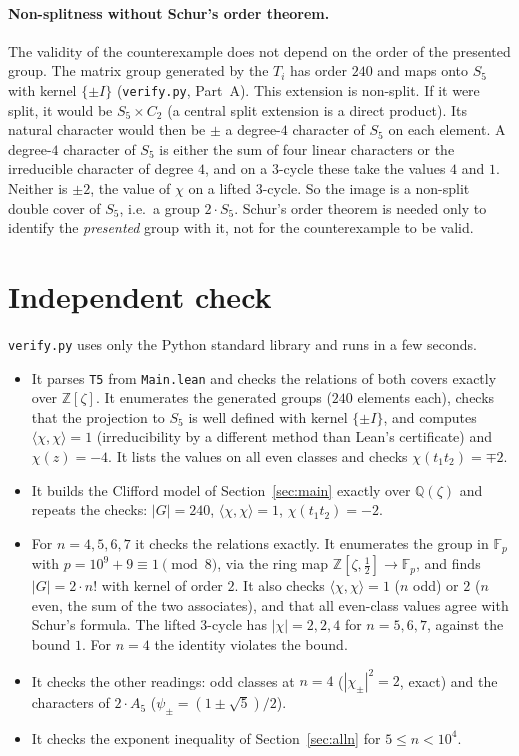 \documentclass[11pt]{article}
\theoremstyle{remark}
\begin{document}
\paragraph{Non-splitness without Schur's order theorem.} The validity of the counterexample does
not depend on the order of the presented group. The matrix group generated by the $T_i$ has order
$240$ and maps onto $S_5$ with kernel $\{\pm I\}$ (\texttt{verify.py}, Part~A). This extension is
non-split. If it were split, it would be $S_5\times C_2$ (a central split extension is a direct
product). Its natural character would then be $\pm$ a degree-$4$ character of $S_5$ on each element.
A degree-$4$ character of $S_5$ is either the sum of four linear characters or the irreducible
character of degree $4$, and on a $3$-cycle these take the values $4$ and $1$. Neither is $\pm2$, the
value of $\chi$ on a lifted $3$-cycle. So the image is a non-split double cover of $S_5$, i.e.\ a
group $2\cdot S_5$. Schur's order theorem is needed only to identify the \emph{presented} group with
it, not for the counterexample to be valid.

\section{Independent check}
\texttt{verify.py} uses only the Python standard library and runs in a few seconds.
\begin{itemize}
\item[A.] It parses \texttt{T5} from \texttt{Main.lean} and checks the relations of both covers
  exactly over $\mathbb{Z}[\zeta]$. It enumerates the generated groups ($240$ elements each),
  checks that the projection to $S_5$ is well defined with kernel $\{\pm I\}$, and computes
  $\langle\chi,\chi\rangle=1$ (irreducibility by a different method than Lean's certificate) and
  $\chi(z)=-4$. It lists the values on all even classes and checks $\chi(t_1t_2)=\mp2$.
\item[B.] It builds the Clifford model of Section~\ref{sec:main} exactly over $\mathbb{Q}(\zeta)$
  and repeats the checks: $|G|=240$, $\langle\chi,\chi\rangle=1$, $\chi(t_1t_2)=-2$.
\item[C.] For $n=4,5,6,7$ it checks the relations exactly. It enumerates the group in
  $\mathbb{F}_p$ with $p=10^9+9\equiv1\pmod8$, via the ring map $\mathbb{Z}[\zeta,\tfrac12]\to\mathbb{F}_p$,
  and finds $|G|=2\cdot n!$ with kernel of order $2$. It also checks $\langle\chi,\chi\rangle=1$
  ($n$ odd) or $2$ ($n$ even, the sum of the two associates), and that all even-class values
  agree with Schur's formula. The lifted $3$-cycle has $|\chi|=2,2,4$ for $n=5,6,7$, against the
  bound $1$. For $n=4$ the identity violates the bound.
\item[D.] It checks the other readings: odd classes at $n=4$ ($|\chi_\pm|^2=2$, exact) and the
  characters of $2\cdot A_5$ ($\psi_\pm=(1\pm\sqrt5)/2$).
\item[E.] It checks the exponent inequality of Section~\ref{sec:alln} for $5\le n<10^4$.
\end{itemize}
\end{document}
